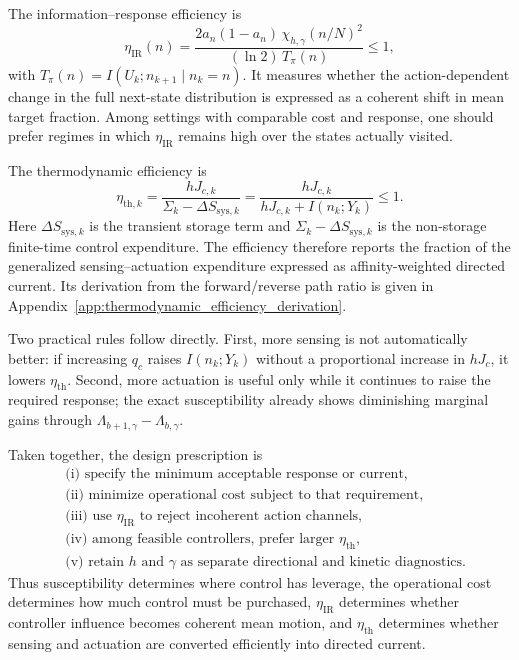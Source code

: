 The information--response efficiency is
\begin{equation}
\eta_{\mathrm{IR}}(n)
=
\frac{2a_n(1-a_n)\,\chi_{h,\gamma}(n/N)^2}
{(\ln 2)\,T_\pi(n)}
\le 1,
\label{eq:app_eta_ir}
\end{equation}
with $T_\pi(n)=I(U_k;n_{k+1}\mid n_k=n)$. It measures whether the
action-dependent change in the full next-state distribution is expressed as a
coherent shift in mean target fraction. Among settings with comparable cost and
response, one should prefer regimes in which $\eta_{\mathrm{IR}}$ remains high
over the states actually visited.

The thermodynamic efficiency is
\begin{equation}
\boxed{
\eta_{\mathrm{th},k}
=
\frac{hJ_{c,k}}{\Sigma_k-\Delta S_{\mathrm{sys},k}}
=
\frac{hJ_{c,k}}{hJ_{c,k}+I(n_k;Y_k)}
\le 1.}
\label{eq:app_eta_th}
\end{equation}
Here $\Delta S_{\mathrm{sys},k}$ is the transient storage term and
$\Sigma_k-\Delta S_{\mathrm{sys},k}$ is the non-storage finite-time control
expenditure. The efficiency therefore reports the fraction of the generalized
sensing--actuation expenditure expressed as affinity-weighted directed current.
Its derivation from the forward/reverse path ratio is given in
Appendix~\ref{app:thermodynamic_efficiency_derivation}.

Two practical rules follow directly. First, more sensing is not automatically
better: if increasing $q_c$ raises $I(n_k;Y_k)$ without a proportional increase
in $hJ_c$, it lowers $\eta_{\mathrm{th}}$. Second, more actuation is useful only
while it continues to raise the required response; the exact susceptibility
already shows diminishing marginal gains through
$\Lambda_{b+1,\gamma}-\Lambda_{b,\gamma}$.

Taken together, the design prescription is
\begin{equation}
\boxed{
\begin{aligned}
&\text{(i) specify the minimum acceptable response or current},\\
&\text{(ii) minimize operational cost subject to that requirement},\\
&\text{(iii) use }\eta_{\mathrm{IR}}\text{ to reject incoherent action channels},\\
&\text{(iv) among feasible controllers, prefer larger }\eta_{\mathrm{th}},\\
&\text{(v) retain }h\text{ and }\gamma\text{ as separate directional and kinetic diagnostics}.
\end{aligned}}
\label{eq:app_design_recipe}
\end{equation}
Thus susceptibility determines where control has leverage, the operational cost
determines how much control must be purchased, $\eta_{\mathrm{IR}}$ determines
whether controller influence becomes coherent mean motion, and
$\eta_{\mathrm{th}}$ determines whether sensing and actuation are converted
efficiently into directed current.

